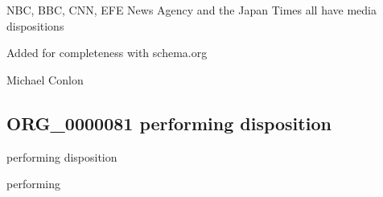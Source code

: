 \documentclass[letterpaper,10pt,english]{sphinxmanual}
\begin{document}
\begin{sphinxShadowBox}

\sphinxAtStartPar
NBC, BBC, CNN, EFE News Agency and the Japan Times all have media dispositions
\end{sphinxShadowBox}

\begin{sphinxShadowBox}

\sphinxAtStartPar
Added for completeness with schema.org
\end{sphinxShadowBox}

\begin{sphinxShadowBox}

\sphinxAtStartPar
Michael Conlon 
\end{sphinxShadowBox}
\begin{quote}

\ignorespaces \end{quote}


\subsection{ORG\_0000081 \sphinxhyphen{} performing disposition}
\label{\detokenize{doc-ORG_0000081:org-0000081-performing-disposition}}\label{\detokenize{doc-ORG_0000081:index-0}}\label{\detokenize{doc-ORG_0000081::doc}}
\begin{sphinxShadowBox}

\sphinxAtStartPar
performing disposition
\end{sphinxShadowBox}

\begin{sphinxShadowBox}

\sphinxAtStartPar
performing
\end{sphinxShadowBox}

\begin{sphinxShadowBox}

\sphinxAtStartPar
{\hyperref[\detokenize{doc-BFO_0000016::doc}]{}}
\end{sphinxShadowBox}
\end{document}

